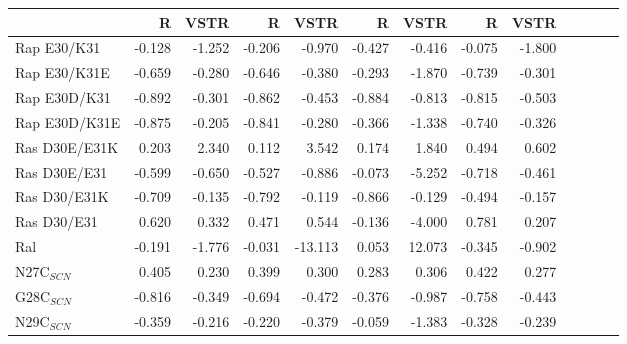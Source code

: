 \documentclass[landscape]{article}
\begin{document}
{\begin{tabular}{ l || r r | r r | r r | r r| r r | r r}
 & \multicolumn{1}{|C{1cm}}{R} & \multicolumn{1}{C{1cm}}{VSTR} & \multicolumn{1}{|C{1cm}}{R} & \multicolumn{1}{C{1cm}}{VSTR} & \multicolumn{1}{|C{1cm}}{R} & \multicolumn{1}{C{1cm}}{VSTR} & \multicolumn{1}{|C{1cm}}{R} & \multicolumn{1}{C{1cm}}{VSTR} \\
\hline\hline
Rap E30/K31    & -0.128         & -1.252         & -0.206         & -0.970         & -0.427         & -0.416         & -0.075         & -1.800        \\
Rap E30/K31E   & -0.659         & -0.280         & -0.646         & -0.380         & -0.293         & -1.870         & -0.739         & -0.301        \\
Rap E30D/K31   & -0.892         & -0.301         & -0.862         & -0.453         & -0.884         & -0.813         & -0.815         & -0.503        \\
Rap E30D/K31E  & -0.875         & -0.205         & -0.841         & -0.280         & -0.366         & -1.338         & -0.740         & -0.326        \\
Ras D30E/E31K  & 0.203          & 2.340          & 0.112          & 3.542          & 0.174          & 1.840          & 0.494          & 0.602         \\
Ras D30E/E31   & -0.599         & -0.650         & -0.527         & -0.886         & -0.073         & -5.252         & -0.718         & -0.461        \\
Ras D30/E31K   & -0.709         & -0.135         & -0.792         & -0.119         & -0.866         & -0.129         & -0.494         & -0.157        \\
Ras D30/E31    & 0.620          & 0.332          & 0.471          & 0.544          & -0.136         & -4.000         & 0.781          & 0.207         \\
Ral            & -0.191         & -1.776         & -0.031         & -13.113        & 0.053          & 12.073         & -0.345         & -0.902        \\
\hline
N27C$_{SCN}$   & 0.405          & 0.230          & 0.399          & 0.300          & 0.283          & 0.306          & 0.422          & 0.277         \\
G28C$_{SCN}$   & -0.816         & -0.349         & -0.694         & -0.472         & -0.376         & -0.987         & -0.758         & -0.443        \\
N29C$_{SCN}$   & -0.359         & -0.216         & -0.220         & -0.379         & -0.059         & -1.383         & -0.328         & -0.239        \\

\end{tabular}}
\end{document}
